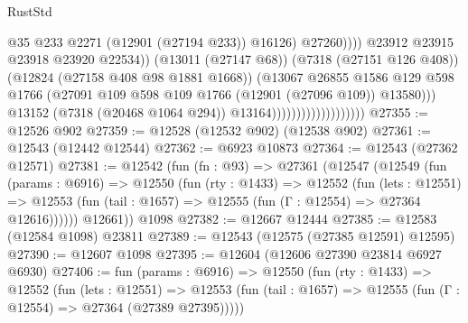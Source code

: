 \begin{lexlean}{RustStd}
\begin{coremodule}
                                                          @35
                                                          @233
                                                          @2271
                                                          (@12901 (@27194 @233))
                                                          @16126)
                                                        @27260))))
                                                @23912
                                                @23915
                                                @23918
                                                @23920
                                                @22534))
                                            (@13011 (@27147 @68))
                                            (@7318 (@27151 @126 @408))
                                            (@12824 (@27158 @408 @98 @1881 @1668))
                                            (@13067
                                              @26855
                                              @1586
                                              @129
                                              @598
                                              @1766
                                              (@27091
                                                @109
                                                @598
                                                @109
                                                @1766
                                                (@12901 (@27096 @109))
                                                @13580)))
                                          @13152
                                          (@7318 (@20468 @1064 @294))
                                          @13164)))))))))))))))))))
@27355 := @12526 @902
@27359 := @12528 (@12532 @902) (@12538 @902)
@27361 := @12543 (@12442 @12544)
@27362 := @6923 @10873
@27364 := @12543 (@27362 @12571)
@27381 := @12542
    (fun (fn : @93) =>
    @27361
      (@12547
        (@12549
          (fun (params : @6916) =>
          @12550
            (fun (rty : @1433) =>
            @12552
              (fun (lets : @12551) =>
              @12553 (fun (tail : @1657) => @12555 (fun (Γ : @12554) => @27364 @12616))))))
        @12661))
    @1098
@27382 := @12667 @12444
@27385 := @12583 (@12584 @1098) @23811
@27389 := @12543 (@12575 (@27385 @12591) @12595)
@27390 := @12607 @1098
@27395 := @12604 (@12606 @27390 @23814 @6927 @6930)
@27406 := fun (params : @6916) =>
  @12550
    (fun (rty : @1433) =>
    @12552
      (fun (lets : @12551) =>
      @12553 (fun (tail : @1657) => @12555 (fun (Γ : @12554) => @27364 (@27389 @27395)))))

\end{coremodule}
\end{lexlean}
